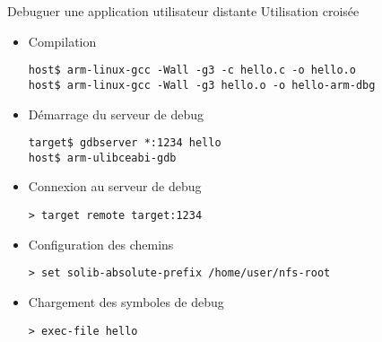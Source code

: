 \begin{frame}[fragile=singleslide]{Debuguer une application utilisateur distante}
  Utilisation croisée
  \begin{itemize}
  \item Compilation
    \begin{lstlisting}
host$ arm-linux-gcc -Wall -g3 -c hello.c -o hello.o
host$ arm-linux-gcc -Wall -g3 hello.o -o hello-arm-dbg
    \end{lstlisting}
  \item Démarrage du serveur de debug
    \begin{lstlisting}
target$ gdbserver *:1234 hello
host$ arm-ulibceabi-gdb
    \end{lstlisting}
  \item Connexion au serveur de debug
    \begin{lstlisting}
> target remote target:1234
    \end{lstlisting}
  \item Configuration des chemins
    \begin{lstlisting}
> set solib-absolute-prefix /home/user/nfs-root
    \end{lstlisting}
  \item Chargement des symboles de debug
    \begin{lstlisting}
> exec-file hello
    \end{lstlisting}
  \end{itemize}
\end{frame}

